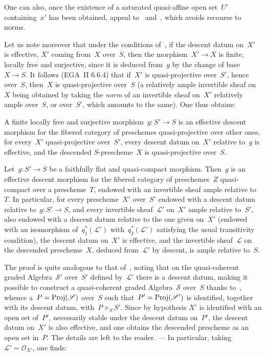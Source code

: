 One can also, once the existence of a saturated quasi-affine open
set~$U'$ containing~$x'$ has been obtained, appeal to~
and~, which avoids recourse to norms.

Let us note moreover that under the conditions of~, if the
descent datum on~$X'$ is effective, $X'$ coming from~$X$
over~$S$, then the morphism~$X'\to X$ is finite, locally free and
surjective, since it is deduced from~$g$ by the change of base~$X\to
S$. It follows (EGA~II 6.6.4) that if~$X'$ is quasi-projective
over~$S'$, hence over~$S$, then~$X$ is quasi-projective over~$S$ (a
relatively ample invertible sheaf on~$X$ being obtained by
taking the \emph{norm} of an invertible sheaf on~$X'$ relatively
ample over~$S$, or over~$S'$, which amounts to the same). One thus
obtains:

\begin{corollary}
\label{VIII.7.7}
A finite locally free and surjective morphism~$g\colon S'\to S$ is
an effective descent morphism for the fibered category
of preschemes quasi-projective over other ones, \ie for
every~$X'$ quasi-projective over~$S'$, every descent datum
on~$X'$ relative to~$g$ is effective, and the
descended $S$-prescheme~$X$ is quasi-projective over~$S$.
\end{corollary}

\begin{proposition}
\label{VIII.7.8}
Let~$g\colon S'\to S$ be a faithfully flat and
quasi-compact morphism. Then~$g$ is an effective descent morphism for
the fibered category of preschemes~$Z$ quasi-compact
over a prescheme~$T$, endowed with an invertible sheaf ample
relative to~$T$. In particular, for every
prescheme~$X'$ over~$S'$ endowed with a descent datum
relative to~$g\colon S'\to S$, and every invertible
sheaf~$\mathcal{L}'$ on~$X'$ ample relative to~$S'$, also
endowed with a descent datum relative to the one
given on~$X'$ (\ie endowed with an isomorphism
of~$q_{1}^*(\mathcal{L}')$ with~$q_{2}^*(\mathcal{L}')$
satisfying the usual transitivity condition), the
descent datum on~$X'$ is effective, and the invertible
sheaf~$\mathcal{L}$ on the descended prescheme~$X$,
deduced from~$\mathcal{L}'$ by descent, is ample relative
to~$S$.
\end{proposition}

The proof is quite analogous to that of~,
noting that on the quasi-coherent graded
Algebra~$\mathcal{S}'$ over~$S'$ defined
by~$\mathcal{L}'$ there is a descent datum, making it possible to
construct a quasi-coherent graded
Algebra~$\mathcal{S}$ over~$S$ thanks
to~, whence a~$P=\operatorname{Proj}(\mathscr{S})$ over~$S$ such
that~$P'=\operatorname{Proj}(\mathscr{S}')$ is identified, together with its descent
datum, with~$P\times_{S}S'$. Since by hypothesis $X'$
is identified with an open set of~$P'$, necessarily stable under the
descent datum on~$P'$, the descent datum on~$X'$
is also effective, and one obtains the descended
prescheme as an open set in~$P$. The details are left to the
reader. --- In particular, taking~$\mathcal{L}'=\mathcal{O}_{X'}$, one
finds:

